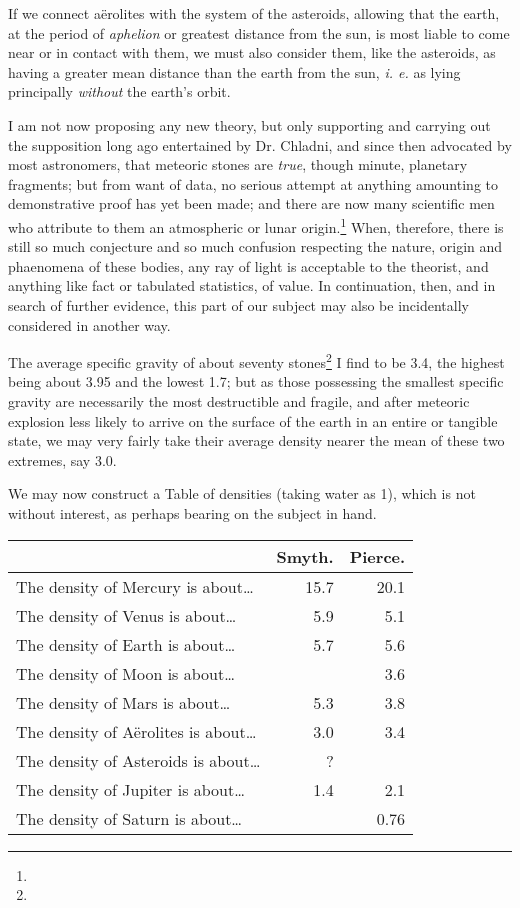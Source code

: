 \documentclass[a4paper, 12pt, oneside]{article}
\begin{document}
If we connect aërolites with the system of the asteroids, allowing that the earth, at the period of \emph{aphelion} or greatest distance from the sun, is most liable to come near or in contact with them, we must also consider them, like the asteroids, as having a greater mean distance than the earth from the sun, \emph{i. e.} as lying principally \emph{without} the earth's orbit.

I am not now proposing any new theory, but only supporting and carrying out the supposition long ago entertained by Dr. Chladni, and since then advocated by most astronomers, that meteoric stones are \emph{true}, though minute, planetary fragments; but from want of data, no serious attempt at anything amounting to demonstrative proof has yet been made; and there are now many scientific men who attribute to them an atmospheric or lunar origin.\footnote{} When, therefore, there is still so much conjecture and so much confusion respecting the nature, origin and phaenomena of these bodies, any ray of light is acceptable to the theorist, and anything like fact or tabulated statistics, of value. In continuation, then, and in search of further evidence, this part of our subject may also be incidentally considered in another way.

The average specific gravity of about seventy stones\footnote{} I find to be 3.4, the highest being about 3.95 and the lowest 1.7; but as those possessing the smallest specific gravity are necessarily the most destructible and fragile, and after meteoric explosion less likely to arrive on the surface of the earth in an entire or tangible state, we may very fairly take their average density nearer the mean of these two extremes, say 3.0.

We may now construct a Table of densities (taking water as 1), which is not without interest, as perhaps bearing on the subject in hand.
\begin{table}[H]
    \centering
    \Fontauri
    \begin{tabular}{l r r}
    \hline
         ~ & Smyth. & Pierce. \\ \hline
        The density of Mercury is about… & 15.7 & 20.1 \\ \hline
        The density of Venus is about… & 5.9 & 5.1 \\ \hline
        The density of Earth is about… & 5.7 & 5.6 \\ \hline
        The density of Moon is about… & ~ & 3.6 \\ \hline
        The density of Mars is about… & 5.3 & 3.8 \\ \hline
        The density of Aërolites is about… & 3.0 & 3.4 \\ \hline
        The density of Asteroids is about… & ? & ~ \\ \hline
        The density of Jupiter is about… & 1.4 & 2.1 \\ \hline
        The density of Saturn is about… & ~ & 0.76 \\ \hline
    \end{tabular}
\end{table}     
\end{document}

